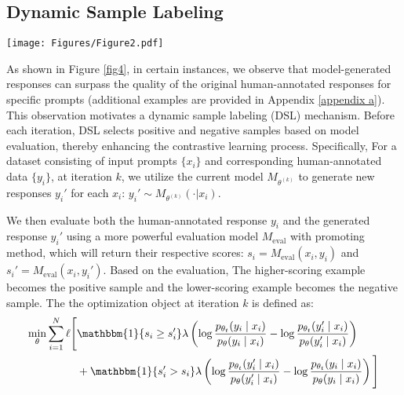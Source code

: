 \subsection{Dynamic Sample Labeling}
\begin{figure*}[t]
    \centering
    \texttt{[image: Figures/Figure2.pdf]}
    \caption{
    Comparison between a human-annotated response from UltraChat-200k and a model-generated answer from Zephyr-7B after a single SPIN iteration. The ground truth misinterprets the user's intent and refuses to respond on clothes reviews. However, Zephyr-7B generates a detailed and descriptive review of a recently purchased blouse, highlighting aspects such as fit, fabric quality, color, and style.}
    \label{fig4}
\end{figure*}
As shown in Figure \ref{fig4}, in certain instances, we observe that model-generated responses can surpass the quality of the original human-annotated responses for specific prompts (additional examples are provided in Appendix \ref{appendix a}). This observation motivates a dynamic sample labeling (DSL) mechanism.
Before each iteration, DSL selects positive and negative samples based on model evaluation, thereby enhancing the contrastive learning process.
Specifically, For a dataset consisting of input prompts \( \{x_i\} \) and corresponding human-annotated data \( \{y_i\} \), at iteration \( k \), we utilize the current model \( M_{\theta^{(k)}} \) to generate new responses \( y_i' \) for each \( x_i \): $y_i' \sim M_{\theta^{(k)}}(\cdot|x_i)$.

We then evaluate both the human-annotated response \( y_i \) and the generated response \( y_i' \) using a more powerful evaluation model \( M_{\text{eval}} \) with promoting method, which will return their respective scores: $s_i = M_{\text{eval}}(x_i, y_i)$  and $ s_i' = M_{\text{eval}}(x_i, y_i') $. Based on the evaluation, The higher-scoring example becomes the positive sample and the lower-scoring example becomes the negative sample. 
The the optimization object at iteration $k$ is defined as:
\begin{align}
\label{eq2}
    \min_{\theta} \sum_{i=1}^N \ell \Bigg[ & \mathbbm{1}\{ s_i \geq s_i' \} \lambda \left( \log \frac{p_{\theta_t}(y_i \mid x_i)}{p_{\theta}(y_i \mid x_i)} - \log \frac{p_{\theta_t}(y_i' \mid x_i)}{p_{\theta}(y_i' \mid x_i)} \right) \nonumber \\
& + \mathbbm{1}\{ s_i' > s_i \} \lambda \left( \log \frac{p_{\theta_t}(y_i' \mid x_i)}{p_{\theta}(y_i' \mid x_i)} - \log \frac{p_{\theta_t}(y_i \mid x_i)}{p_{\theta}(y_i \mid x_i)} \right) \Bigg]
\end{align}

